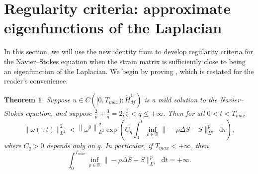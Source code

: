 \documentclass[11pt]{article}
\theoremstyle{plain}
\newtheorem{theorem}{Theorem}[section]
\theoremstyle{remark}
\numberwithin{equation}{section}
\newcommand{\diff}{\mathop{}\!\mathrm{d}}
\begin{document}
\section{Regularity criteria: approximate eigenfunctions of the Laplacian} \label{RegCritEigen}


In this section, we will use the new identity from  to develop regularity criteria for the Navier--Stokes equation when the strain matrix is sufficiently close to being an eigenfunction of the Laplacian. We begin by proving , which is restated for the reader's convenience.


\begin{theorem} \label{StrainAlmostEigen}
Suppose $u\in C\left([0,T_{max});\dot{H}^1_{df}\right)$
is a mild solution to the Navier--Stokes equation,
and suppose $\frac{2}{p}+\frac{3}{q}=2,
\frac{3}{2}<q\leq +\infty$.
Then for all $0<t<T_{max}$
\begin{equation} \label{StrainAlmostEigenBound}
    \|\omega(\cdot,t)\|_{L^2}^2
    <\left\|\omega^0\right\|_{L^2}^2
    \exp\left(C_q
    \int_0^{t}\inf_{\rho\in\mathbb{R}}
    \|-\rho\Delta S-S\|_{L^q}^p \diff\tau \right),
\end{equation}
where $C_q>0$ depends only on $q$.
In particular, if $T_{max}<+\infty$, then
\begin{equation}
    \int_0^{T_{max}}\inf_{\rho\in\mathbb{R}}
    \|-\rho\Delta S-S\|_{L^q}^p \diff t
    =+\infty.
\end{equation}
\end{theorem}
\end{document}
